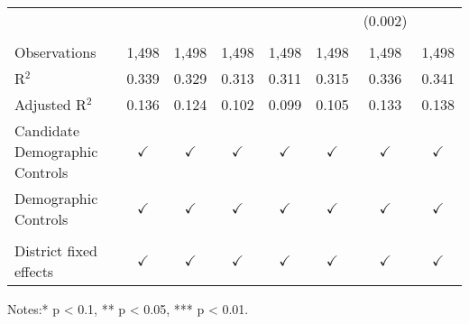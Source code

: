 \begin{table}[htbp]
\begin{tabular}{lccccccc}
                                     &               &               &               &               &                & (0.002)        &   \\   
       \\
      Observations                   & 1,498         & 1,498         & 1,498         & 1,498         & 1,498          & 1,498          & 1,498\\  
      R$^2$                          & 0.339         & 0.329         & 0.313         & 0.311         & 0.315          & 0.336          & 0.341\\  
      Adjusted R$^2$                 & 0.136         & 0.124         & 0.102         & 0.099         & 0.105          & 0.133          & 0.138\\  
      Candidate Demographic Controls & $\checkmark$  & $\checkmark$  & $\checkmark$  & $\checkmark$  & $\checkmark$   & $\checkmark$   & $\checkmark$\\   
      Demographic Controls           & $\checkmark$  & $\checkmark$  & $\checkmark$  & $\checkmark$  & $\checkmark$   & $\checkmark$   & $\checkmark$\\   
       \\
      District fixed effects         & $\checkmark$  & $\checkmark$  & $\checkmark$  & $\checkmark$  & $\checkmark$   & $\checkmark$   & $\checkmark$\\   
      \bottomrule
   \end{tabular}
   
   \par \raggedright 
   \footnotesize Notes:* p < 0.1, ** p < 0.05, *** p < 0.01. 
\end{table}


